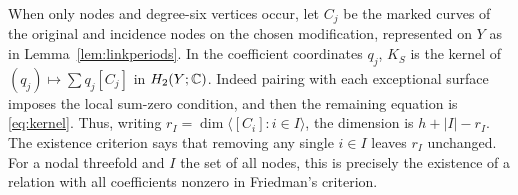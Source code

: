 When only nodes and degree-six vertices occur, let $C_j$ be the
marked curves of the original and incidence nodes on the chosen
modification, represented on $Y$ as in Lemma~\ref{lem:linkperiods}.
In the coefficient coordinates $q_j$, $K_S$ is the kernel of
$(q_j)\mapsto\sum q_j[C_j]$ in $H_2(Y;\mathbb C)$. Indeed pairing with
each exceptional surface imposes the local sum-zero condition, and
then the remaining equation is \eqref{eq:kernel}. Thus, writing
$r_I=\dim\langle[C_i]:i\in I\rangle$, the dimension is
$h+|I|-r_I$. The existence criterion says that removing any single
$i\in I$ leaves $r_I$ unchanged. For a nodal threefold and $I$ the
set of all nodes, this is precisely the existence of a relation with
all coefficients nonzero in Friedman's criterion.
